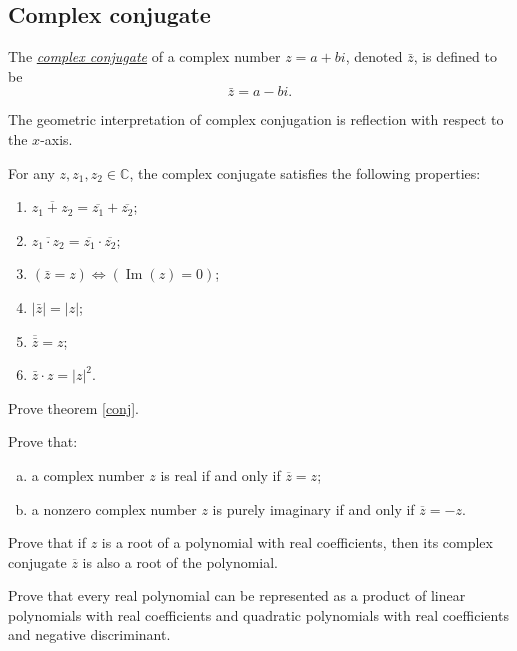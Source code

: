 \subsection{Complex conjugate}

\begin{definition}
The \underline{\it complex conjugate} of a complex number $z=a+b i$, denoted $\bar{z}$, is defined to be
$$
\bar{z} = a-b i .
$$
\end{definition}

The geometric interpretation of complex conjugation is reflection with respect to the $x$-axis.

\begin{theorem}\label{conj}
For any $z, z_1, z_2 \in \mathbb{C}$, the complex conjugate satisfies the following properties:
\begin{enumerate}
\item $\overline{z_1+z_2}=\overline{z_1}+\overline{z_2}$;
\item $\overline{z_1 \cdot z_2}=\overline{z_1} \cdot \overline{z_2}$;
\item $(\bar{z}=z) \Leftrightarrow(\operatorname{Im}(z)=0)$;
\item $|\bar{z}|=|z|$;
\item $\overline{\bar{z}}=z$;
\item $\bar{z} \cdot z=|z|^2$.
\end{enumerate}
\end{theorem}

\begin{exercise}
Prove theorem \ref{conj}.
\end{exercise}

\begin{exercise}
Prove that:
\begin{enumerate}[a)]
\item a complex number $z$ is real if and only if $\overline{z} = z$;
\item a nonzero complex number $z$ is purely imaginary if and only if $\overline{z} = -z$.
\end{enumerate}
\end{exercise}

\begin{exercise}
Prove that if $z$ is a root of a polynomial with real coefficients, then its complex conjugate $\overline{z}$ is also a root of the polynomial.
\end{exercise}

\begin{exercise}
Prove that every real polynomial can be represented as a product of linear polynomials with real coefficients and quadratic polynomials with real coefficients and negative discriminant.
\end{exercise}


